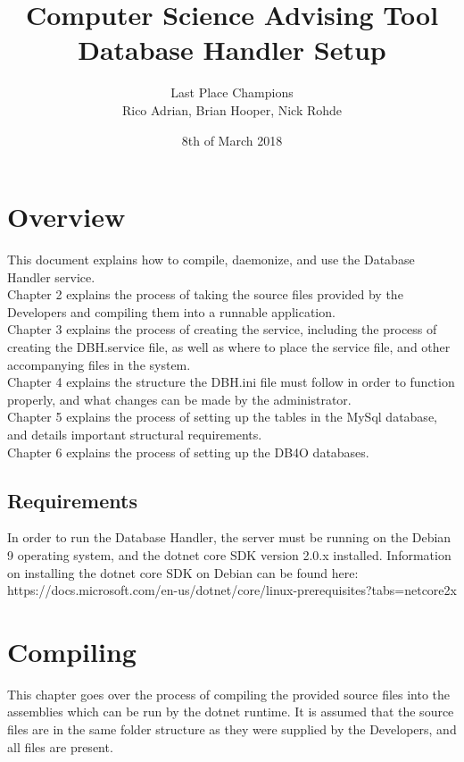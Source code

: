 \documentclass[letterpaper]{report}
\title{Computer Science Advising Tool \\ Database Handler Setup}
\author{Last Place Champions \\ Rico Adrian, Brian Hooper, Nick Rohde}
\date{8th of March 2018}
\begin{document}
	\maketitle
	\tableofcontents
	
	\chapter{Overview}
	This document explains how to compile, daemonize, and use the Database Handler service. \\ Chapter 2 explains the process of taking the source files provided by the Developers and compiling them into a runnable application. \\ Chapter 3 explains the process of creating the service, including the process of creating the DBH.service file, as well as where to place the service file, and other accompanying files in the system.\\ Chapter 4 explains the structure the DBH.ini file must follow in order to function properly, and what changes can be made by the administrator. \\ Chapter 5 explains the process of setting up the tables in the MySql database, and details important structural requirements. \\ Chapter 6 explains the process of setting up the DB4O databases.
	\section{Requirements}
	In order to run the Database Handler, the server must be running on the Debian 9 operating system, and the dotnet core SDK version 2.0.x installed. Information on installing the dotnet core SDK on Debian can be found here: https://docs.microsoft.com/en-us/dotnet/core/linux-prerequisites?tabs=netcore2x
	 
	\chapter{Compiling}
	This chapter goes over the process of compiling the provided source files into the assemblies which can be run by the dotnet runtime. It is assumed that the source files are in the same folder structure as they were supplied by the Developers, and all files are present.
\end{document}

